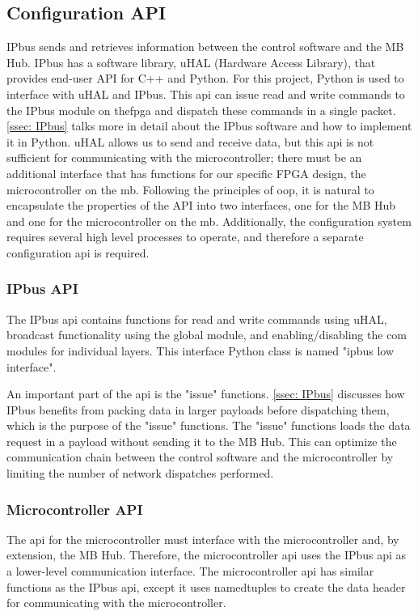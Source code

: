 \documentclass[main.tex]{subfiles}
\begin{document}
\subsection{Configuration API}
\label{ssec: mcu_api}
IPbus sends and retrieves information between the control software and the MB Hub. IPbus has a software library, uHAL (Hardware Access Library), that provides end-user API for C++ and Python. For this project,  Python is used to interface with uHAL and IPbus. This \gls{api} can issue read and write commands to the IPbus module on the\gls{fpga} and dispatch these commands in a single packet. \autoref{ssec: IPbus} talks more in detail about the IPbus software and how to implement it in Python. uHAL allows us to send and receive data, but this \gls{api} is not sufficient for communicating with the microcontroller; there must be an additional interface that has functions for our specific FPGA design, the microcontroller on the \gls{mb}. Following the principles of \gls{oop}, it is natural to encapsulate the properties of the API into two interfaces, one for the MB Hub and one for the microcontroller on the \gls{mb}. Additionally, the configuration system requires several high level processes to operate, and therefore a separate configuration \gls{api} is required.

\subsubsection{IPbus API}
The IPbus \gls{api} contains functions for read and write commands using uHAL, broadcast functionality using the global module, and enabling/disabling the com modules for individual layers. This interface Python class is named "ipbus low interface".

An important part of the \gls{api} is the "issue" functions. \autoref{ssec: IPbus} discusses how IPbus benefits from packing data in larger payloads before dispatching them, which is the purpose of the "issue" functions. The "issue" functions loads the data request in a payload without sending it to the MB Hub. This can optimize the communication chain between the control software and the microcontroller by limiting the number of network dispatches performed.

\subsubsection{Microcontroller API}

The \gls{api} for the microcontroller must interface with the microcontroller and, by extension, the MB Hub. Therefore, the microcontroller \gls{api} uses the IPbus \gls{api} as a lower-level communication interface. The microcontroller \gls{api} has similar functions as the IPbus \gls{api}, except it uses namedtuples to create the data header for communicating with the microcontroller.
\end{document}
